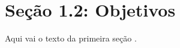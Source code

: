 \section{Seção 1.2: Objetivos}
Aqui vai o texto da primeira seção \cite{exemplochapter1sec2} \cite{artigo2024chapter1sec2}.

\printbibliography[heading=subbibliography, title={Referências da Seção 1.2}, keyword=chapter1secao2]